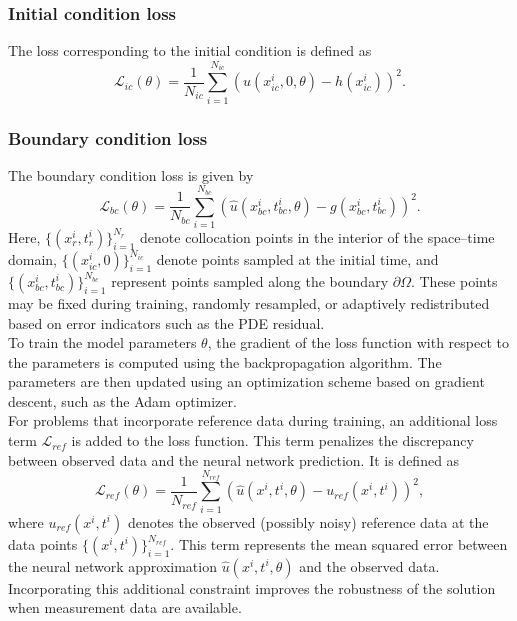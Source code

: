 \documentclass[10pt,reqno]{article}
\numberwithin{equation}{section}
\begin{document}
\subsubsection*{Initial condition loss}
The loss corresponding to the initial condition is defined as
\begin{equation}
\mathcal{L}_{ic}(\theta)
=
\frac{1}{N_{ic}}
\sum_{i=1}^{N_{ic}}
\left(
\hat{u}(x_{ic}^i,0,\theta) - h(x_{ic}^i)
\right)^2.
\label{eq:icloss}
\end{equation}
\subsubsection*{Boundary condition loss}

The boundary condition loss is given by
\begin{equation}
\mathcal{L}_{bc}(\theta)
=
\frac{1}{N_{bc}}
\sum_{i=1}^{N_{bc}}
\left(
\hat{u}(x_{bc}^i,t_{bc}^i,\theta) - g(x_{bc}^i,t_{bc}^i)
\right)^2.
\label{eq:bcloss}
\end{equation}
Here, $\{(x_r^i,t_r^i)\}_{i=1}^{N_r}$ denote collocation points in the interior of the space--time domain, $\{(x_{ic}^i,0)\}_{i=1}^{N_{ic}}$ denote points sampled at the initial time, and $\{(x_{bc}^i,t_{bc}^i)\}_{i=1}^{N_{bc}}$ represent points sampled along the boundary $\partial\Omega$. These points may be fixed during training, randomly resampled, or adaptively redistributed based on error indicators such as the PDE residual.
\\To train the model parameters $\theta$, the gradient of the loss function with respect to the parameters is computed using the backpropagation algorithm. The parameters are then updated using an optimization scheme based on gradient descent, such as the Adam optimizer.\\

For problems that incorporate reference data during training, an additional loss term $\mathcal{L}_{ref}$ is added to the loss function. This term penalizes the discrepancy between observed data and the neural network prediction. It is defined as
\begin{equation}
\mathcal{L}_{ref}(\theta)
=
\frac{1}{N_{ref}}
\sum_{i=1}^{N_{ref}}
\left(
\hat{u}(x^i,t^i,\theta)
-
u_{ref}(x^i,t^i)
\right)^2,
\label{eq:lref}
\end{equation}
where $u_{ref}(x^i,t^i)$ denotes the observed (possibly noisy) reference data at the data points $\{(x^i,t^i)\}_{i=1}^{N_{ref}}$. This term represents the mean squared error between the neural network approximation $\hat{u}(x^i,t^i,\theta)$ and the observed data. Incorporating this additional constraint improves the robustness of the solution when measurement data are available.
\end{document}
